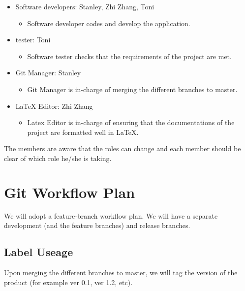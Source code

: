\documentclass{article}
\begin{document}
\begin{itemize}
    \item Software developers: Stanley, Zhi Zhang, Toni
    \begin{itemize}
        \item Software developer codes and develop the application.
    \end{itemize}
\end{itemize}

\begin{itemize}
    \item tester: Toni
    \begin{itemize}
        \item Software tester checks that the requirements of the project are met.
    \end{itemize}
\end{itemize}

\begin{itemize}
    \item Git Manager: Stanley
    \begin{itemize}
        \item Git Manager is in-charge of merging the different branches to master.
    \end{itemize}
\end{itemize}

\begin{itemize}
    \item LaTeX Editor: Zhi Zhang
    \begin{itemize}
        \item Latex Editor is in-charge of ensuring that the documentations of the project are formatted well in LaTeX.
    \end{itemize}
\end{itemize}

The members are aware that the roles can change and each member should be clear of which role he/she is taking.

\section{Git Workflow Plan}
We will adopt a feature-branch workflow plan. We will have a separate development (and the feature branches) and release branches.

\subsection{Label Useage}
Upon merging the different branches to master, we will tag the version of the product (for example ver 0.1, ver 1.2, etc).
\end{document}
